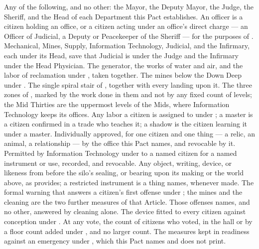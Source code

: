 \begin{definitionlist}
 Any of the following, and no other: the Mayor, the Deputy Mayor, the Judge, the Sheriff, and the Head of each Department this Pact establishes. An officer is a citizen holding an office, or a citizen acting under an office's direct charge --- an Officer of Judicial, a Deputy or Peacekeeper of the Sheriff --- for the purposes of .
 Mechanical, Mines, Supply, Information Technology, Judicial, and the Infirmary, each under its Head, save that Judicial is under the Judge and the Infirmary under the Head Physician.
 The generator, the works of water and air, and the labor of reclamation under , taken together.
 The mines below the Down Deep under .
 The single spiral stair of , together with every landing upon it.
 The three zones of , marked by the work done in them and not by any fixed count of levels; the Mid Thirties are the uppermost levels of the Mids, where Information Technology keeps its offices.
 Any labor a citizen is assigned to under ; a master is a citizen confirmed in a trade who teaches it; a shadow is the citizen learning it under a master.
 Individually approved, for one citizen and one thing --- a relic, an animal, a relationship --- by the office this Pact names, and revocable by it.
 Permitted by Information Technology under  to a named citizen for a named instrument or use, recorded, and revocable.
 Any object, writing, device, or likeness from before the silo's sealing, or bearing upon its making or the world above, as  provides; a restricted instrument is a thing  names, whenever made.
 The formal warning that answers a citizen's first offense under ; the mines and the cleaning are the two further measures of that Article.
 Those offenses  names, and no other, answered by cleaning alone.
 The device fitted to every citizen against conception under .
 At any vote, the count of citizens who voted, in the hall or by a floor count added under , and no larger count.
 The measures kept in readiness against an emergency under , which this Pact names and does not print.
\end{definitionlist}
